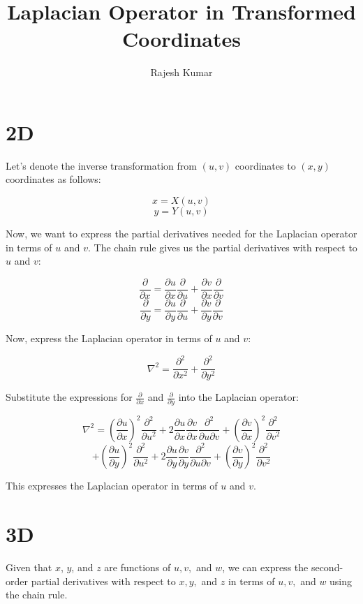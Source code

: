 \documentclass[a4paper, 12pt]{article}
\title{Laplacian Operator in Transformed Coordinates }
\author{Rajesh Kumar}
\begin{document}
\maketitle
\section*{2D}
Let's denote the inverse transformation from \( (u, v) \) coordinates to \( (x, y) \) coordinates as follows:

\[ x = X(u, v) \]
\[ y = Y(u, v) \]

Now, we want to express the partial derivatives needed for the Laplacian operator in terms of \( u \) and \( v \). The chain rule gives us the partial derivatives with respect to \( u \) and \( v \):

\[ \frac{\partial}{\partial x} = \frac{\partial u}{\partial x}\frac{\partial}{\partial u} + \frac{\partial v}{\partial x}\frac{\partial}{\partial v} \]
\[ \frac{\partial}{\partial y} = \frac{\partial u}{\partial y}\frac{\partial}{\partial u} + \frac{\partial v}{\partial y}\frac{\partial}{\partial v} \]

Now, express the Laplacian operator in terms of \( u \) and \( v \):

\[ \nabla^2 = \frac{\partial^2}{\partial x^2} + \frac{\partial^2}{\partial y^2} \]

Substitute the expressions for \( \frac{\partial}{\partial x} \) and \( \frac{\partial}{\partial y} \) into the Laplacian operator:

\[ \nabla^2 = \left(\frac{\partial u}{\partial x}\right)^2\frac{\partial^2}{\partial u^2} + 2\frac{\partial u}{\partial x}\frac{\partial v}{\partial x}\frac{\partial^2}{\partial u \partial v} + \left(\frac{\partial v}{\partial x}\right)^2\frac{\partial^2}{\partial v^2} \]
\[ + \left(\frac{\partial u}{\partial y}\right)^2\frac{\partial^2}{\partial u^2} + 2\frac{\partial u}{\partial y}\frac{\partial v}{\partial y}\frac{\partial^2}{\partial u \partial v} + \left(\frac{\partial v}{\partial y}\right)^2\frac{\partial^2}{\partial v^2} \]

This expresses the Laplacian operator in terms of \( u \) and \( v \).

\section*{3D}
Given that \( x \), \( y \), and \( z \) are functions of \( u, v, \) and \( w \), we can express the second-order partial derivatives with respect to \( x, y, \) and \( z \) in terms of \( u, v, \) and \( w \) using the chain rule.
\end{document}
